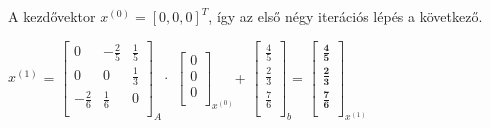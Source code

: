 \documentclass[tikz,12pt,margin=0px]{article}
\newcommand\ddfrac[2]{\frac{\displaystyle #1}{\displaystyle #2}}
\begin{document}
    \noindent A kezdővektor $x^{(0)} = \left[0,0,0\right]^{T}$, így az első négy iterációs lépés a következő.

    \begin{center}
        $x^{(1)}$ =
        $\begin{bmatrix}
            0 & -\ddfrac{2}{5} & \ddfrac{1}{5} \\[0.3em]
            0 & 0 & \ddfrac{1}{3} \\[0.3em]
            -\ddfrac{2}{6} & \ddfrac{1}{6} & 0 \\[0.3em]
        \end{bmatrix}_{A} \cdot$
        $\begin{bmatrix}
            0 \\[0.3em]
            0 \\[0.3em]
            0 \\[0.3em]
        \end{bmatrix}_{x^{(0)}}$+
        $\begin{bmatrix}
            \ddfrac{4}{5} \\[0.3em]
            \ddfrac{2}{3} \\[0.3em]
            \ddfrac{7}{6} \\[0.3em]
        \end{bmatrix}_{b}$=
        $\begin{bmatrix}
            \ddfrac{\textbf{4}}{\textbf{5}} \\[0.3em]
            \ddfrac{\textbf{2}}{\textbf{3}} \\[0.3em]
            \ddfrac{\textbf{7}}{\textbf{6}} \\[0.3em]
        \end{bmatrix}_{x^{(1)}}$
    \end{center}
\end{document}

